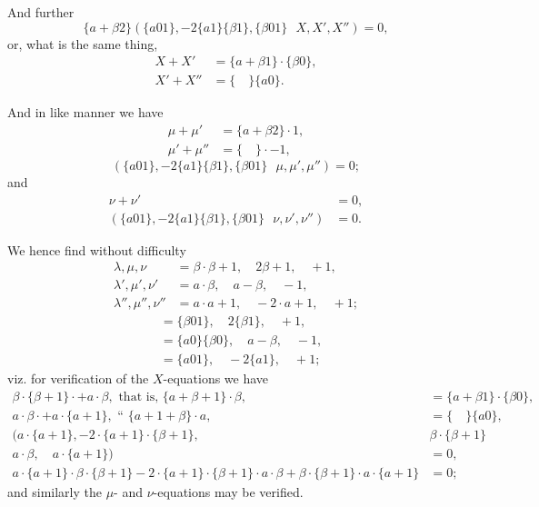 \documentclass[11pt,a4paper]{book}
\begin{document}
And further
\[
\{a + \beta 2\}(\{a01\}, -2\{a1\}\{\beta1\}, \{\beta01\} \,\,\,\, X, X', X'') = 0,
\]
or, what is the same thing,
\begin{align*}
X + X' &= \{a + \beta 1\} \cdot \{\beta 0\}, \\
X' + X'' &= \{ \quad \} \{a0\}.
\end{align*}

And in like manner we have
\begin{align*}
\mu + \mu' &= \{a + \beta 2\} \cdot 1, \\
\mu' + \mu'' &= \{ \quad \} \cdot -1,
\end{align*}
\[
(\{a01\}, -2\{a1\}\{\beta1\}, \{\beta01\} \,\,\,\, \mu, \mu', \mu'') = 0;
\]
and
\begin{align*}
\nu + \nu' &= 0, \\
(\{a01\}, -2\{a1\}\{\beta1\}, \{\beta01\} \,\,\,\, \nu, \nu', \nu'') &= 0.
\end{align*}

We hence find without difficulty
\begin{align*}
\lambda, \mu, \nu &= \beta \cdot \beta + 1, \quad 2\beta + 1, \quad +1, \\
\lambda', \mu', \nu' &= a \cdot \beta, \quad a - \beta, \quad -1, \\
\lambda'', \mu'', \nu'' &= a \cdot a + 1, \quad -2 \cdot a + 1, \quad +1;
\end{align*}
\begin{align*}
&= \{\beta 01\}, \quad 2\{\beta 1\}, \quad +1, \\
&= \{a0\}\{\beta 0\}, \quad a - \beta, \quad -1, \\
&= \{a01\}, \quad -2\{a1\}, \quad +1;
\end{align*}
viz. for verification of the $X$-equations we have
\begin{align*}
\beta \cdot \{\beta + 1\} \cdot + a \cdot \beta, \text{ that is, } \{a + \beta + 1\} \cdot \beta, &= \{a + \beta 1\} \cdot \{\beta 0\}, \\
a \cdot \beta \cdot + a \cdot \{a + 1\}, \text{ `` } \{a + 1 + \beta\} \cdot a, &= \{ \quad \} \{a0\}, \\
(a \cdot \{a + 1\}, -2 \cdot \{a + 1\} \cdot \{\beta + 1\}, \quad &\beta \cdot \{\beta + 1\} \\
a \cdot \beta, \quad a \cdot \{a + 1\}) &= 0, \\
a \cdot \{a + 1\} \cdot \beta \cdot \{\beta + 1\} - 2 \cdot \{a + 1\} \cdot \{\beta + 1\} \cdot a \cdot \beta + \beta \cdot \{\beta + 1\} \cdot a \cdot \{a + 1\} &= 0;
\end{align*}
and similarly the $\mu$- and $\nu$-equations may be verified.
\end{document}
